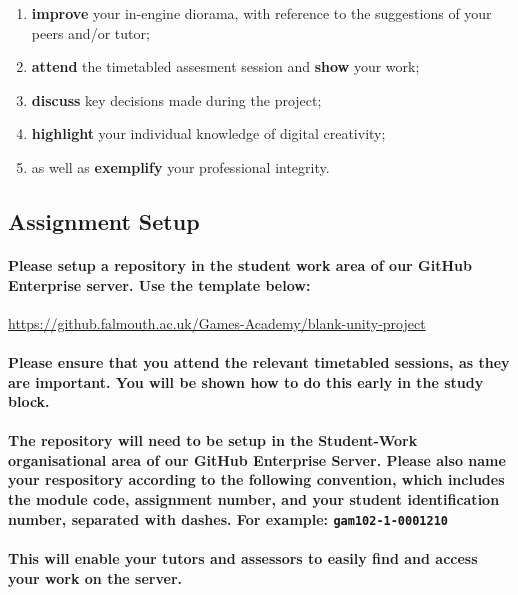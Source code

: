 \documentclass{../../fal_assignment}
\begin{document}
\begin{enumerate}
    	\begin{enumerate}
    	 	\item \textbf{improve} your in-engine diorama, with reference to the suggestions of your peers and/or tutor;
  		\item \textbf{attend} the timetabled assesment session and \textbf{show} your work;  
    		\item \textbf{discuss} key decisions made during the project;
    		\item \textbf{highlight} your individual knowledge of digital creativity;
    		\item as well as \textbf{exemplify} your professional integrity.
	\end{enumerate}
\end{enumerate}

\vspace{1em}

\subsection*{Assignment Setup}

\paragraph{Please setup a repository in the student work area of our GitHub Enterprise server. Use the template below:} 

\url{https://github.falmouth.ac.uk/Games-Academy/blank-unity-project}

\paragraph{Please ensure that you attend the relevant timetabled sessions, as they are important. You will be shown how to do this early in the study block.}

\paragraph{The repository will need to be setup in the \textbf{Student-Work} organisational area of our GitHub Enterprise Server. Please also name your respository according to the following convention, which includes the module code, assignment number, and your student identification number, separated with dashes. For example: \texttt{gam102-1-0001210}} 
 
\paragraph{This will enable your tutors and assessors to easily find and access your work on the server.}
\end{document}
